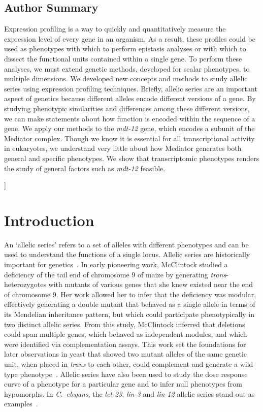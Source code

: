 \documentclass[10pt, twocolumn]{article}
\newcommand{\cel}{\emph{C.~elegans}}
\newcommand{\gene}[1]{\mbox{\emph{#1}}}
\newcommand{\dpy}{\gene{mdt-12}}
\begin{document}
\begin{@twocolumnfalse}
{    \section*{Author Summary}
    Expression profiling is a way to quickly and quantitatively measure the
    expression level of every gene in an organism. As a result, these profiles
    could be used as phenotypes with which to perform epistasis analyses or with
    which to dissect the functional units contained within a single gene. To
    perform these analyses, we must extend genetic methods, developed for scalar
    phenotypes, to multiple dimensions. We developed new concepts and methods
    to study allelic series using expression profiling techniques. Briefly,
    allelic series are an important aspect of genetics because different alleles
    encode different versions of a gene. By studying phenotypic similarities and
    differences among these different versions, we can make statements about how
    function is encoded within the sequence of a gene. We apply our methods to
    the \dpy{} gene, which encodes a subunit of the Mediator complex. Though we
    know it is essential for all transcriptional activity in eukaryotes, we
    understand very little about how Mediator generates both general and
    specific phenotypes. We show that transcriptomic phenotypes renders the
    study of general factors such as \dpy{} feasible.
    }
  \vspace{3mm}

  \end{@twocolumnfalse}
]


\linenumbers{}
\section*{Introduction}
An `allelic series' refers to a set of alleles with different phenotypes
and can be used to understand the functions of a single locus.
Allelic series are historically important for genetics~\cite{McClintock1944}. In
early pioneering work, McClintock studied a deficiency of the tail end of
chromosome 9 of maize by generating \emph{trans}-heterozygotes with mutants of
various genes that she knew existed near the end of chromosome 9. Her work
allowed her to infer that the deficiency was modular, effectively generating a
double mutant that behaved as a single allele in terms of its Mendelian
inheritance pattern, but which could participate phenotypically in two distinct
allelic series. From this study, McClintock inferred that deletions could span
multiple genes, which behaved as independent modules, and which were identified
via complementation assays. This work set the foundations for later observations
in yeast that showed two mutant alleles of the same genetic unit, when placed in
\emph{trans} to each other, could complement and generate a wild-type
phenotype~\cite{FINCHAM1957}. Allelic series have also been used to study the
dose response curve of a phenotype for a particular gene and to infer null
phenotypes from hypomorphs. In \cel{}, the \gene{let-23}, \gene{lin-3} and
\gene{lin-12} allelic series stand out as
examples~\cite{Aroian1991,Ferguson1985a,Greenwald1983}.
\end{document}
